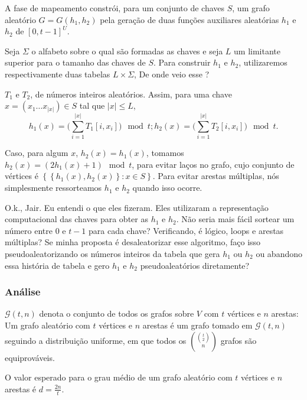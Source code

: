 \documentclass[a4paper,oneside]{article}
\def\MMp{\mathrm{.}}
\def\MMpv{\mathrm{;}}
\def\leq{\leqslant}
\def\chaves#1{\left\{#1\right\}}
\def\cj#1{\chaves{#1}}
\def\cjpp#1#2{\chaves{#1\colon#2}}
\theoremstyle{defnotnom}
\theoremstyle{teoaxicorlem}
\begin{document}
\begin{description}
{A fase de mapeamento constrói, para um conjunto de chaves $S$, um grafo aleatório $G=G(h_1, h_2)$ pela geração de duas funções auxiliares aleatórias $h_1$ e $h_2$ de $[0,t-1]^U$.

Seja $\Sigma$ o alfabeto sobre o qual são formadas as chaves e seja $L$ um limitante superior para o tamanho das chaves de $S$. Para construir $h_1$ e $h_2$, utilizaremos respectivamente duas tabelas $L\times\Sigma$, De onde veio esse \Sigma?} $T_1$ e $T_2$, de números inteiros aleatórios. Assim, para uma chave $x=(x_1\dots x_{|x|})\in S$ tal que $|x|\leq L$,
\begin{equation*}
h_1(x) = \biggl(\sum_{i=1}^{|x|}T_1[i,x_i]\biggr)\mod t\MMpv
h_2(x) = \biggl(\sum_{i=1}^{|x|}T_2[i,x_i]\biggr)\mod t\MMp
\end{equation*}

Caso, para algum $x$, $h_2(x)=h_1(x)$, tomamos $h_2(x)=(2h_1(x)+1)\mod t$, para evitar laços no grafo, cujo conjunto de vértices é $\cjpp{\cj{h_1(x),h_2(x)}}{x\in S}$. Para evitar arestas múltiplas, nós simplesmente ressorteamos $h_1$ e $h_2$ quando isso ocorre.

O.k., Jair. Eu entendi o que eles fizeram. Eles utilizaram a representação computacional das chaves para obter as $h_1$ e $h_2$. Não seria mais fácil sortear um número entre $0$ e $t-1$ para cada chave? Verificando, é lógico, loops e arestas múltiplas? Se minha proposta é desaleatorizar esse algoritmo, faço isso pseudoaleatorizando os números inteiros da tabela que gera $h_1$ ou $h_2$ ou abandono essa história de tabela e gero $h_1$ e $h_2$ pseudoaleatórios diretamente?

\subsubsection{Análise}

\begin{Not}
  $\mathscr{G}(t,n)$ denota o conjunto de todos os
  grafos sobre $V$ com $t$
  vértices e $n$ arestas:
  Um grafo aleatório com $t$ vértices e $n$
  arestas é um grafo tomado em $\mathscr{G}(t,n)$ seguindo a
  distribuição uniforme, em que todos os $\binom{\binom{t}{2}}{n}$
  grafos são equiprováveis.
\end{Not}

\begin{Propr}
  O valor esperado para o grau médio de um grafo aleatório com $t$
  vértices e $n$ arestas é $d=\frac{2n}t$.
\end{Propr}


\end{description}
\end{document}
